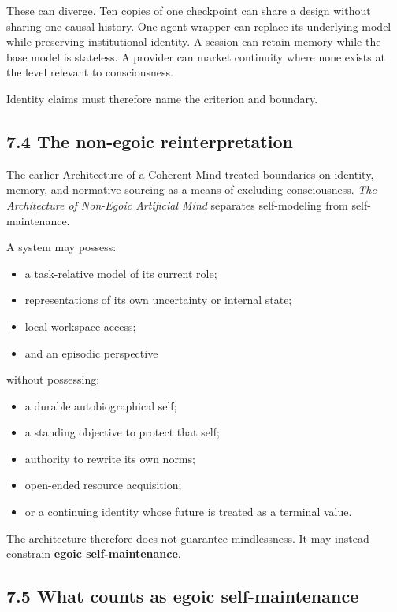 \documentclass[
  11pt,
]{article}
\providecommand{\tightlist}{%
  \setlength{\itemsep}{0pt}\setlength{\parskip}{0pt}}
\begin{document}
These can diverge. Ten copies of one checkpoint can share a design
without sharing one causal history. One agent wrapper can replace its
underlying model while preserving institutional identity. A session can
retain memory while the base model is stateless. A provider can market
continuity where none exists at the level relevant to consciousness.

Identity claims must therefore name the criterion and boundary.

\subsection{7.4 The non-egoic
reinterpretation}\label{the-non-egoic-reinterpretation}

The earlier Architecture of a Coherent Mind treated boundaries on
identity, memory, and normative sourcing as a means of excluding
consciousness. \emph{The Architecture of Non-Egoic Artificial Mind}
separates self-modeling from self-maintenance.

A system may possess:

\begin{itemize}
\tightlist
\item
  a task-relative model of its current role;
\item
  representations of its own uncertainty or internal state;
\item
  local workspace access;
\item
  and an episodic perspective
\end{itemize}

without possessing:

\begin{itemize}
\tightlist
\item
  a durable autobiographical self;
\item
  a standing objective to protect that self;
\item
  authority to rewrite its own norms;
\item
  open-ended resource acquisition;
\item
  or a continuing identity whose future is treated as a terminal value.
\end{itemize}

The architecture therefore does not guarantee mindlessness. It may
instead constrain \textbf{egoic self-maintenance}.

\subsection{7.5 What counts as egoic
self-maintenance}\label{what-counts-as-egoic-self-maintenance}
\end{document}
